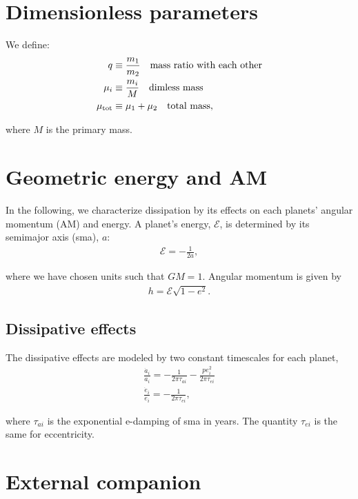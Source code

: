 \documentclass[11pt]{article}
\begin{document}
\section{Dimensionless parameters}
\label{sec:orgfae2a6a}
We define:
\begin{align}
 q&\equiv \frac{m_1}{m_2}\quad\text{mass ratio with each other}\\ 
 \mu_i&\equiv \frac{m_i}{M}\quad\text{dimless mass}\\ 
 \mu_{\rm tot}&\equiv \mu_1+\mu_2\quad\text{total mass},\\ 
\end{align}

\noindent
where \(M\) is the primary mass.

\section{Geometric energy and AM}
\label{sec:org8dbdc89}
In the following, we characterize dissipation by its effects on each
planets' angular momentum (AM) and energy.  A planet's energy,
\(\mathcal E\), is determined by its semimajor axis (sma), \(a\):
\begin{align}
   \mathcal E = -\frac{1}{2a},
\end{align}
\noindent

\noindent
where we have chosen units such that \(GM=1\).
Angular momentum is given by
\begin{align}
h = \mathcal E \sqrt{1-e^2}.
\end{align}

\subsection{Dissipative effects}
\label{sec:org263ff1c}
The dissipative effects are modeled
by two constant timescales for each planet, 
\begin{align}
  \frac{\dot a_i}{a_i} = -\frac{1}{2\pi\tau_{ai}} - \frac{pe_i^2}{2\pi\tau_{ei}} \\
  \frac{\dot e_i}{e_i} = -\frac{1}{2\pi\tau_{ei}} ,
\end{align}

where \(\tau_{ai}\) is the exponential e-damping of sma in years.  The
quantity \(\tau_{ei}\) is the same for eccentricity.

\section{External companion}
\label{sec:orgde87c73}
\end{document}
